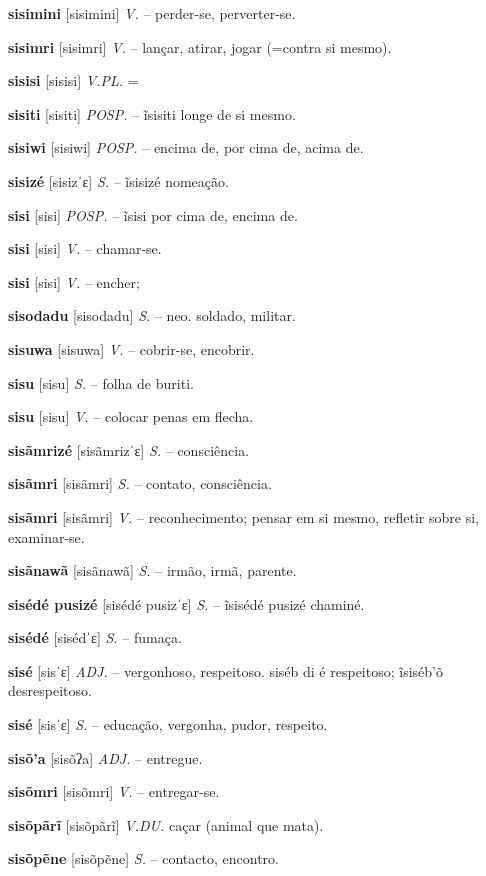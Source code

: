 \textbf{sisimini} [sisimini] \textit{V.} -- perder-se, perverter-se.

\textbf{sisimri} [sisimri] \textit{V.} -- lançar, atirar, jogar (=contra si mesmo).

\textbf{sisisi} [sisisi] \textit{V.PL.} =

\textbf{sisiti} [sisiti] \textit{POSP.} -- ĩsisiti longe de si mesmo.

\textbf{sisiwi} [sisiwi] \textit{POSP.} -- encima de, por cima de, acima de.

\textbf{sisizé} [sisizˈɛ] \textit{S.} -- ĩsisizé nomeação.

\textbf{sisi} [sisi] \textit{POSP.} -- ĩsisi por cima de, encima de.

\textbf{sisi} [sisi] \textit{V.} -- chamar-se.

\textbf{sisi} [sisi] \textit{V.} -- encher;

\textbf{sisodadu} [sisodadu] \textit{S.} -- neo. soldado, militar.

\textbf{sisuwa} [sisuwa] \textit{V.} -- cobrir-se, encobrir.

\textbf{sisu} [sisu] \textit{S.} -- folha de buriti.

\textbf{sisu} [sisu] \textit{V.} -- colocar penas em flecha.

\textbf{sisãmrizé} [sisãmrizˈɛ] \textit{S.} -- consciência.

\textbf{sisãmri} [sisãmri] \textit{S.} -- contato, consciência.

\textbf{sisãmri} [sisãmri] \textit{V.} -- reconhecimento; pensar em si mesmo, refletir sobre si, examinar-se.

\textbf{sisãnawã} [sisãnawã] \textit{S.} -- irmão, irmã, parente.

\textbf{sisédé pusizé} [sisédé pusizˈɛ] \textit{S.} -- ĩsisédé pusizé chaminé.

\textbf{sisédé} [sisédˈɛ] \textit{S.} -- fumaça.

\textbf{sisé} [sisˈɛ] \textit{ADJ.} -- vergonhoso, respeitoso. siséb di é respeitoso; ĩsiséb'õ desrespeitoso.

\textbf{sisé} [sisˈɛ] \textit{S.} -- educação, vergonha, pudor, respeito.

\textbf{sisõ'a} [sisõʔa] \textit{ADJ.} -- entregue.

\textbf{sisõmri} [sisõmri] \textit{V.} -- entregar-se.

\textbf{sisõpãrĩ} [sisõpãrĩ] \textit{V.DU.} caçar (animal que mata).

\textbf{sisõpẽne} [sisõpẽne] \textit{S.} -- contacto, encontro.

